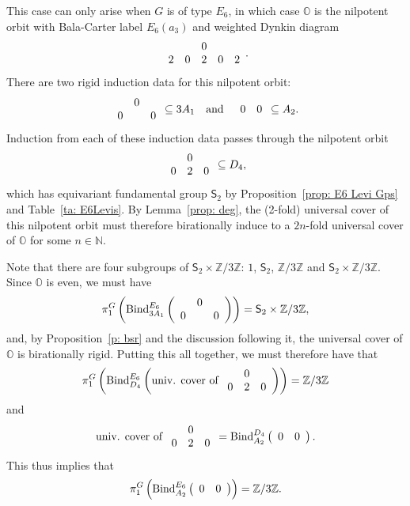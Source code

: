 \documentclass[11pt]{amsart}
\renewcommand{\O}{{\mathbb O}}
\newcommand{\bZ}{{\mathbb Z}}
\newcommand{\N}{{\mathbb N}}
\newcommand{\Sym}{{\mathsf{S}}}
\newcommand{\BInd}{{{\mbox{\rm Bind}}}}
\numberwithin{equation}{section}
\begin{document}
	This case can only arise when $G$ is of type $E_6$, in which case $\O$ is the nilpotent orbit with Bala-Carter label $E_6(a_3)$ and weighted Dynkin diagram 
	$$\begin{array}{c c c c c }
		& & 0 & & \\
		2 & 0 & 2 & 0 & 2 \\
	\end{array}.$$ There are two rigid induction data for this nilpotent orbit:
	$$\begin{array}{c c c}
		& 0 &\\
		0 &  & 0   \\
	\end{array}\subseteq 3 A_1\quad\mbox{and}\quad \begin{array}{c c}
		0 & 0 \\
	\end{array}\subseteq A_2.$$ 
	Induction from each of these induction data passes through the nilpotent orbit  
	$$\begin{array}{c c c}
		& 0 &\\
		0 & 2 & 0   \\
	\end{array}\subseteq D_4,$$ which has equivariant fundamental group $\Sym_2$ by Proposition~\ref{prop: E6 Levi Gps} and Table~\ref{ta: E6Levis}. By Lemma~\ref{prop: deg}, the (2-fold) universal cover of this nilpotent orbit must therefore birationally induce to a $2n$-fold universal cover of $\O$ for some $n\in\N$.
	
	Note that there are four subgroups of $\Sym_2\times \bZ/3\bZ$: $1$, $\Sym_2$, $\bZ/3\bZ$ and $\Sym_2\times \bZ/3\bZ$. Since $\O$ is even, we must have $$\pi_1^G\left(\BInd_{3 A_1}^{E_6}\left(\begin{array}{c c c}
		& 0 &\\
		0 & & 0   \\
	\end{array}\right)\right)=\Sym_2\times \bZ/3\bZ,$$ and, by Proposition~\ref{p: bsr} and the discussion following it, the universal cover of $\O$ is birationally rigid. Putting this all together,  we must therefore have that $$\pi_1^G\left(\BInd_{D_4}^{E_6}\left(\mbox{univ. cover of }\begin{array}{c c c}
		& 0 &\\
		0 & 2 & 0   \\
	\end{array}\right)\right)=\bZ/3\bZ$$ and $$\mbox{univ. cover of } \begin{array}{c c c}
		& 0 &\\
		0 & 2 & 0   \\
	\end{array}=\BInd_{A_2}^{D_4}\left( \begin{array}{c c}
		0 & 0   \\
	\end{array}\right).$$ This thus implies that $$\pi_1^G\left(\BInd_{A_2}^{E_6}\left(\begin{array}{c c}
		0 & 0   \\
	\end{array}\right)\right)=\bZ/3\bZ.$$ 
	
\end{document}

